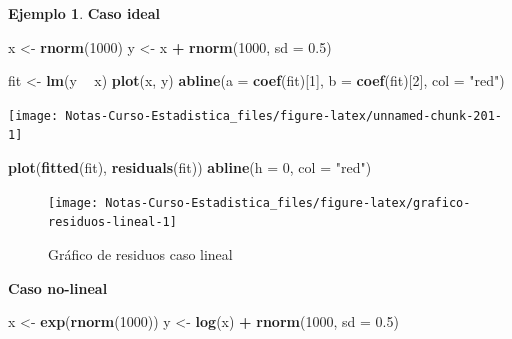 \documentclass[
  12pt,
]{book}
\newenvironment{Shaded}{\begin{snugshade}}{\end{snugshade}}
\newcommand{\DataTypeTok}[1]{\textcolor[rgb]{0.13,0.29,0.53}{#1}}
\newcommand{\DecValTok}[1]{\textcolor[rgb]{0.00,0.00,0.81}{#1}}
\newcommand{\FloatTok}[1]{\textcolor[rgb]{0.00,0.00,0.81}{#1}}
\newcommand{\KeywordTok}[1]{\textcolor[rgb]{0.13,0.29,0.53}{\textbf{#1}}}
\newcommand{\NormalTok}[1]{#1}
\newcommand{\OperatorTok}[1]{\textcolor[rgb]{0.81,0.36,0.00}{\textbf{#1}}}
\newcommand{\StringTok}[1]{\textcolor[rgb]{0.31,0.60,0.02}{#1}}
\theoremstyle{definition}
\theoremstyle{definition}
\newtheorem{example}{Ejemplo}[chapter]
\theoremstyle{definition}
\theoremstyle{remark}
\begin{document}
\begin{example}

\textbf{Caso ideal}

\begin{Shaded}
\begin{Highlighting}[]
\NormalTok{x <-}\StringTok{ }\KeywordTok{rnorm}\NormalTok{(}\DecValTok{1000}\NormalTok{)}
\NormalTok{y <-}\StringTok{ }\NormalTok{x }\OperatorTok{+}\StringTok{ }\KeywordTok{rnorm}\NormalTok{(}\DecValTok{1000}\NormalTok{, }\DataTypeTok{sd =} \FloatTok{0.5}\NormalTok{)}

\NormalTok{fit <-}\StringTok{ }\KeywordTok{lm}\NormalTok{(y }\OperatorTok{~}\StringTok{ }\NormalTok{x)}
\KeywordTok{plot}\NormalTok{(x, y)}
\KeywordTok{abline}\NormalTok{(}\DataTypeTok{a =} \KeywordTok{coef}\NormalTok{(fit)[}\DecValTok{1}\NormalTok{], }\DataTypeTok{b =} \KeywordTok{coef}\NormalTok{(fit)[}\DecValTok{2}\NormalTok{], }\DataTypeTok{col =} \StringTok{"red"}\NormalTok{)}
\end{Highlighting}
\end{Shaded}

\begin{center}\texttt{[image: Notas-Curso-Estadistica\_files/figure-latex/unnamed-chunk-201-1]} \end{center}

\begin{Shaded}
\begin{Highlighting}[]
\KeywordTok{plot}\NormalTok{(}\KeywordTok{fitted}\NormalTok{(fit), }\KeywordTok{residuals}\NormalTok{(fit))}
\KeywordTok{abline}\NormalTok{(}\DataTypeTok{h =} \DecValTok{0}\NormalTok{, }\DataTypeTok{col =} \StringTok{"red"}\NormalTok{)}
\end{Highlighting}
\end{Shaded}

\begin{figure}

{\centering \texttt{[image: Notas-Curso-Estadistica\_files/figure-latex/grafico-residuos-lineal-1]} 

}

\caption{Gráfico de residuos caso lineal}\label{fig:grafico-residuos-lineal}
\end{figure}

\textbf{Caso no-lineal}

\begin{Shaded}
\begin{Highlighting}[]
\NormalTok{x <-}\StringTok{ }\KeywordTok{exp}\NormalTok{(}\KeywordTok{rnorm}\NormalTok{(}\DecValTok{1000}\NormalTok{))}
\NormalTok{y <-}\StringTok{ }\KeywordTok{log}\NormalTok{(x) }\OperatorTok{+}\StringTok{ }\KeywordTok{rnorm}\NormalTok{(}\DecValTok{1000}\NormalTok{, }\DataTypeTok{sd =} \FloatTok{0.5}\NormalTok{)}


\end{Highlighting}
\end{Shaded}
\end{example}
\end{document}
